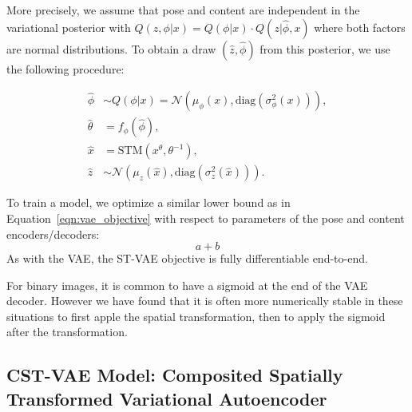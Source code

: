 More precisely, we assume that pose and content are independent in the variational posterior with
$Q(z, \phi | x) = Q(\phi |x)\cdot Q(z |\hat{\phi}, x)$ where both factors are normal distributions.  
To obtain a draw $(\hat{z}, \hat{\phi})$ from this posterior, we use the following procedure:

\begin{align*}
\hat{\phi} &\sim Q(\phi|x) = \mathcal{N}(\mu_\phi(x), \mbox{diag}(\sigma_\phi^2(x))), \\
\hat{\theta} &= f_\phi(\hat{\phi}), \\
\hat{x} &= \mbox{STM}(x^\theta, \theta^{-1}), \\
\hat{z} &\sim \mathcal{N}(\mu_z(\hat{x}), \mbox{diag}(\sigma_z^2(\hat{x}))).
\end{align*}

To train a model, we
optimize a similar lower bound as in Equation~\ref{eqn:vae_objective} with respect to parameters of the pose and content encoders/decoders:
\[
a+b
\]
As with the VAE, the ST-VAE objective is fully differentiable end-to-end.

For binary images, it is common to have a sigmoid at the end of the VAE decoder.
However we have found that it is often more numerically stable in these situations to first apple the spatial transformation, then
to apply the sigmoid after the transformation.

  
 
 
 


\subsection{{\bf CST-VAE} Model: Composited Spatially Transformed Variational Autoencoder}\label{sec:cstvae}


